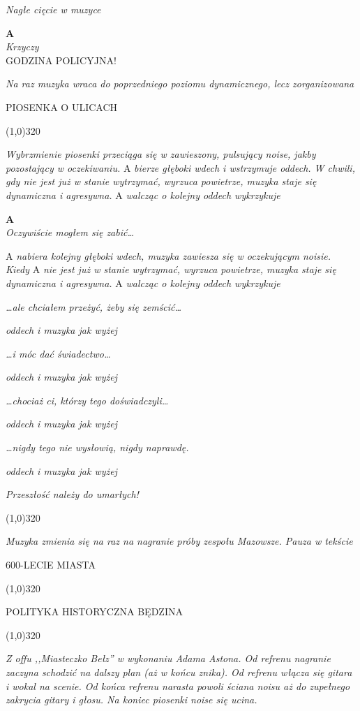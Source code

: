 \documentclass[11pt,a4paper,oneside]{article}
\begin{document}
{\color{light-gray} \emph{Nagłe cięcie w muzyce}}

\textbf{A}\\
{\color{light-gray} \emph{Krzyczy}}\\
GODZINA POLICYJNA!

{\color{light-gray} \emph{Na raz muzyka wraca do poprzedniego poziomu
dynamicznego, lecz zorganizowana}}

{\color{red}
PIOSENKA O ULICACH
}

\line(1,0){320}

{\color{light-gray} \emph{Wybrzmienie piosenki przeciąga się w zawieszony, pulsujący noise, jakby pozostający w oczekiwaniu.} A \emph{bierze głęboki wdech i wstrzymuje oddech. W chwili, gdy nie jest już w stanie wytrzymać, wyrzuca powietrze, muzyka staje się dynamiczna i agresywna.} A \emph{walcząc o kolejny oddech wykrzykuje}}

\textbf{A}\\
\emph{Oczywiście mogłem się zabić\dots{}} 

{\color{light-gray} A \emph{nabiera kolejny głęboki wdech, muzyka zawiesza się w oczekującym noisie. Kiedy} A \emph{nie jest już w stanie wytrzymać, wyrzuca powietrze, muzyka staje się dynamiczna i agresywna.} A \emph{walcząc o kolejny oddech wykrzykuje}}

\emph{\dots{}ale chciałem przeżyć, żeby się zemścić\dots{}}

{\color{light-gray} \emph{oddech i muzyka jak wyżej}}

\emph{\dots{}i móc dać świadectwo\dots{}}

{\color{light-gray} \emph{oddech i muzyka jak wyżej}}

\emph{\dots{}chociaż ci, którzy tego doświadczyli\dots{}}

{\color{light-gray} \emph{oddech i muzyka jak wyżej}}

\emph{\dots{}nigdy tego nie wysłowią, nigdy naprawdę.}

{\color{light-gray} \emph{oddech i muzyka jak wyżej}}

\emph{Przeszłość należy do umarłych!}

\line(1,0){320}

{\color{light-gray} \emph{Muzyka zmienia się na raz na nagranie próby zespołu Mazowsze. Pauza w tekście}}


{\color{red}
600-LECIE MIASTA
}

\line(1,0){320}

{\color{red}
POLITYKA HISTORYCZNA BĘDZINA
}

\line(1,0){320}

{\color{light-gray} \emph{Z offu ,,Miasteczko Bełz'' w wykonaniu Adama Astona. Od refrenu nagranie zaczyna schodzić na dalszy plan (aż w końcu znika). Od refrenu włącza się gitara i wokal na scenie. Od końca refrenu narasta powoli ściana noisu aż do zupełnego zakrycia gitary i głosu. Na koniec piosenki noise się ucina.}}
\end{document}
